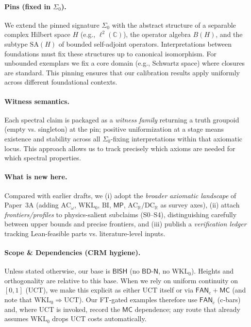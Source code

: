 \documentclass[11pt]{article}
\newcommand{\MP}{\mathsf{MP}}
\newcommand{\FTc}{\mathsf{FAN}_{\mathrm{c}}}
\newcommand{\MC}{\mathsf{MC}}
\newcommand{\BDN}{\mathsf{BD}\text{-}\mathsf{N}}
\theoremstyle{plain}
\theoremstyle{definition}
\theoremstyle{remark}
\newcommand{\C}{\mathbb{C}}
\newcommand{\BISH}{\mathsf{BISH}}
\newcommand{\ACw}{\mathrm{AC}_\omega}
\newcommand{\ACR}{\mathrm{AC}_{\mathbb{R}}}
\newcommand{\DCR}{\mathrm{DC}_{\mathbb{R}}}
\newcommand{\WKLz}{\mathrm{WKL}_0}
\newcommand{\BI}{\mathrm{BI}}
\newcommand{\UCT}{\mathrm{UCT}}
\newcommand{\SigmaZero}{\Sigma_{0}}
\begin{document}
\paragraph{Pins (fixed in $\SigmaZero$).}
We extend the pinned signature $\SigmaZero$ with the abstract structure of a separable complex Hilbert space $H$ (e.g., $\ell^2(\C)$), the operator algebra $B(H)$,
and the subtype $\mathrm{SA}(H)$ of bounded self-adjoint operators. Interpretations between foundations must fix these structures up to canonical isomorphism. For unbounded exemplars we fix a
core domain (e.g., Schwartz space) where closures are standard. This pinning ensures that our calibration results apply uniformly across different foundational contexts.

\paragraph{Witness semantics.}
Each spectral claim is packaged as a \emph{witness family} returning a truth groupoid (empty vs. singleton)
at the pin; positive uniformization at a stage means existence and stability across all $\SigmaZero$-fixing interpretations within that axiomatic locus.
This approach allows us to track precisely which axioms are needed for which spectral properties.

\paragraph{What is new here.}
Compared with earlier drafts, we (i) adopt the \emph{broader axiomatic landscape} of Paper~3A (adding $\ACw$, $\WKLz$, $\BI$, $\MP$, $\ACR/\DCR$ as survey axes), (ii) attach \emph{frontiers/profiles} to physics-salient subclaims (S0--S4), distinguishing carefully between upper bounds and precise frontiers, and (iii) publish a \emph{verification ledger} tracking Lean-feasible parts vs. literature-level inputs.

\paragraph{Scope \& Dependencies (CRM hygiene).}
Unless stated otherwise, our base is \(\BISH\) (no \(\BDN\), no \(\WKLz\)). Heights and orthogonality are relative to this base.
When we rely on uniform continuity on \([0,1]\) (UCT), we make this explicit as either
\(\UCT\) itself or via \(\FTc+\MC\) (and note that \(\WKLz\Rightarrow \UCT\)).
Our FT‑gated examples therefore use \(\FTc\) (c‑bars) and, where UCT is invoked, record the
\(\MC\) dependence; any route that already assumes \(\WKLz\) drops UCT costs automatically.
\end{document}
